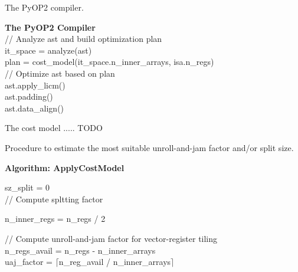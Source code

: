\documentclass[conference]{IEEEtran}
\begin{document}

\begin{algorithm}[t]
\caption{The PyOP2 compiler.}
\label{algo:PyOP2Compiler}
  \textbf{The PyOP2 Compiler}\\
// Analyze ast and build optimization plan \\
it\_space = analyze(ast) \\
plan = cost\_model(it\_space.n\_inner\_arrays, isa.n\_regs) \\
// Optimize ast based on plan \\
ast.apply\_licm() \\
ast.padding() \\
ast.data\_align() \\
\end{algorithm}


The cost model ..... TODO

\begin{algorithm}[t]
\caption{Procedure to estimate the most suitable unroll-and-jam factor and/or split size.}
\label{algo:applyCostModel}
  \textbf{Algorithm: ApplyCostModel}\\


sz\_split = 0 \\
// Compute spltting factor \\

n\_inner\_regs = n\_regs / 2 \\

// Compute unroll-and-jam factor for vector-register tiling \\
n\_regs\_avail = n\_regs - n\_inner\_arrays \\
uaj\_factor = $\lceil$n\_reg\_avail / n\_inner\_arrays$\rceil$ \\
\end{algorithm}
\end{document}
